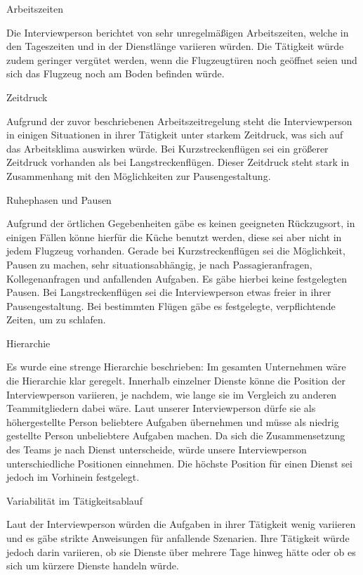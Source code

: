 \documentclass[12pt, a4paper]{article}
\begin{document}
Arbeitszeiten

Die Interviewperson berichtet von sehr unregelmäßigen Arbeitszeiten, welche in den Tageszeiten und in der Dienstlänge variieren würden.
Die Tätigkeit würde zudem geringer vergütet werden, wenn die Flugzeugtüren noch geöffnet seien und sich das Flugzeug noch am Boden befinden würde. 

Zeitdruck

Aufgrund der zuvor beschriebenen Arbeitszeitregelung steht die Interviewperson in einigen Situationen in ihrer Tätigkeit unter starkem Zeitdruck,
was sich auf das Arbeitsklima auswirken würde. 
Bei Kurzstreckenflügen sei ein größerer Zeitdruck vorhanden als bei Langstreckenflügen.
Dieser Zeitdruck steht stark in Zusammenhang mit den Möglichkeiten zur Pausengestaltung.

Ruhephasen und Pausen

Aufgrund der örtlichen Gegebenheiten gäbe es keinen geeigneten Rückzugsort, in einigen Fällen könne hierfür die Küche benutzt werden,
diese sei aber nicht in jedem Flugzeug vorhanden.
Gerade bei Kurzstreckenflügen sei die Möglichkeit, Pausen zu machen, sehr situationsabhängig, 
je nach Passagieranfragen, Kollegenanfragen und anfallenden Aufgaben. 
Es gäbe hierbei keine festgelegten Pausen. Bei Langstreckenflügen sei die Interviewperson etwas freier in ihrer Pausengestaltung.
Bei bestimmten Flügen gäbe es festgelegte, verpflichtende Zeiten, um zu schlafen. 

Hierarchie

Es wurde eine strenge Hierarchie beschrieben: Im gesamten Unternehmen wäre die Hierarchie klar geregelt.
Innerhalb einzelner Dienste könne die Position der Interviewperson variieren, je nachdem, wie lange sie im Vergleich zu anderen
Teammitgliedern dabei wäre. Laut unserer Interviewperson dürfe sie als höhergestellte Person beliebtere Aufgaben übernehmen und müsse als 
niedrig gestellte Person unbeliebtere Aufgaben machen. Da sich die Zusammensetzung des Teams je nach Dienst unterscheide, 
würde unsere Interviewperson unterschiedliche Positionen einnehmen. Die höchste Position für einen Dienst sei jedoch im Vorhinein festgelegt. 

Variabilität im Tätigkeitsablauf

Laut der Interviewperson würden die Aufgaben in ihrer Tätigkeit wenig variieren und es gäbe strikte Anweisungen für anfallende Szenarien.
Ihre Tätigkeit würde jedoch darin variieren, ob sie Dienste über mehrere Tage hinweg hätte oder ob es sich um kürzere Dienste handeln würde. 
\end{document}

